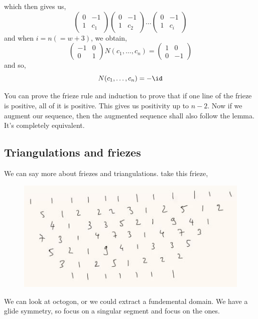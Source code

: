 \documentclass{article}
\begin{document}
which then gives us,
$$ \begin{pmatrix}
  0 & -1 \\ 1 & c_1
\end{pmatrix}\begin{pmatrix}
0 & -1 \\ 1 & c_2
\end{pmatrix} \dots \begin{pmatrix}
0 & -1 \\ 1 & c_i
\end{pmatrix} $$
and when $i = n (= w+ 3)$, we obtain,
$$ \begin{pmatrix}
  -1 & 0 \\ 0 & 1
\end{pmatrix} N(c_1, \dots, c_n) = \begin{pmatrix}
  1 & 0 \\ 0 & -1
\end{pmatrix}$$
and so,
$$ N(c_1, \dots, c_n) = -\id $$

You can prove the frieze rule and induction to prove that if one line of the frieze is positive, all of it is positive. This gives us positivity up to $n-2$. Now if we augment our sequence, then the augmented sequence shall also follow the lemma. It's completely equivalent.\\

\subsection{Triangulations and friezes}
We can say more about friezes and triangulations. take this frieze,
\begin{figure}[!ht]
\centering
\includegraphics{./figures/L3.1}
\end{figure}

We can look at octogon, or we could extract a fundemental domain. We have a glide symmetry, so focus on a singular segment and focus on the ones.\\
\end{document}
